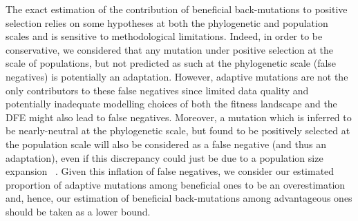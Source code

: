 \documentclass{article}
\begin{document}
    The exact estimation of the contribution of beneficial back-mutations to positive selection relies on some hypotheses at both the phylogenetic and population scales and is sensitive to methodological limitations.
    Indeed, in order to be conservative, we considered that any mutation under positive selection at the scale of populations, but not predicted as such at the phylogenetic scale (false negatives) is potentially an adaptation.
    However, adaptive mutations are not the only contributors to these false negatives since limited data quality and potentially inadequate modelling choices of both the fitness landscape and the DFE might also lead to false negatives.
    Moreover, a mutation which is inferred to be nearly-neutral at the phylogenetic scale, but found to be positively selected at the population scale will also be considered as a false negative (and thus an adaptation), even if this discrepancy could just be due to a population size expansion ~\cite{lanfear_population_2014, jones_shifting_2017, platt_protein_2018}.
    Given this inflation of false negatives, we consider our estimated proportion of adaptive mutations among beneficial ones to be an overestimation and, hence, our estimation of beneficial back-mutations among advantageous ones should be taken as a lower bound.
\end{document}
